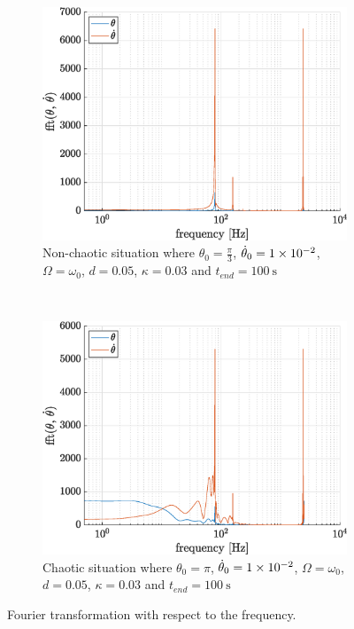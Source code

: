 \documentclass[a4paper,12pt,twoside]{article}
\begin{document}
\begin{figure}[h]
\begin{subfigure}[t]{0.48\textwidth}
	\includegraphics[width=\textwidth]{graphs/g_fourier_non_chaotic.eps}
	\caption{Non-chaotic situation where $\theta_0 = \frac{\pi}{3}$, $\dot{\theta}_0 = \num{1d-2}$, $\Omega = \omega_0$, $d=0.05$, $\kappa=0.03$ and $t_{end} = \SI{100}{\s}$}
	\label{fig:g-fourier-fft-non-chaotic}
\end{subfigure}
~
\begin{subfigure}[t]{0.48\textwidth}
	\includegraphics[width=\textwidth]{graphs/g_fourier_chaotic.eps}
	\caption{Chaotic situation where $\theta_0 = \pi$, $\dot{\theta}_0 = \num{1d-2}$, $\Omega = \omega_0$, $d=0.05$, $\kappa=0.03$ and $t_{end} = \SI{100}{\s}$}
	\label{fig:g-fourier-fft-chaotic}
\end{subfigure}
\caption{Fourier transformation with respect to the frequency.}
\label{fig:g-fourier-fft}
\end{figure}
\end{document}
